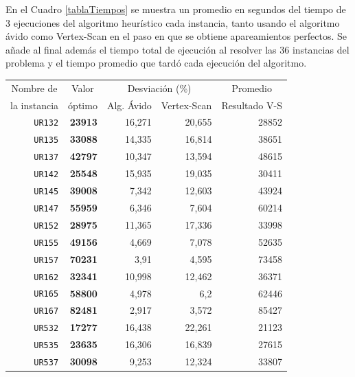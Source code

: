 \documentclass[11pt]{article}
\begin{document}
En el Cuadro \ref{tablaTiempos} se muestra un promedio en
segundos del tiempo de 3 ejecuciones del algoritmo heurístico
cada instancia, tanto usando el algoritmo ávido como Vertex-Scan 
en el paso en que se obtiene apareamientos perfectos. Se añade al
final además el tiempo total de ejecución al resolver las 36 instancias
del problema y el tiempo promedio que tardó cada ejecución del
algoritmo.

\begin{table}[htbp]
   \begin{center}
   \begin{tabular}{|r|r|r|r|r|}
   \hline
   \multicolumn{1}{|c|}{Nombre de} & \multicolumn{1}{c|}{Valor} & \multicolumn{ 2}{c|}{Desviación (\%)} & \multicolumn{1}{c|}{Promedio } \\ \cline{3-4}
   \multicolumn{1}{|c|}{la instancia} & \multicolumn{1}{c|}{óptimo} & \multicolumn{1}{c|}{Alg. Ávido} & \multicolumn{1}{c|}{Vertex-Scan} & \multicolumn{1}{c|}{Resultado V-S} \\ \hline
   \texttt{UR132} & \textbf{23913} & 16,271 & 20,655 & 28852 \\
   \texttt{UR135} & \textbf{33088} & 14,335 & 16,814 & 38651 \\
   \texttt{UR137} & \textbf{42797} & 10,347 & 13,594 & 48615 \\
   \texttt{UR142} & \textbf{25548} & 15,935 & 19,035 & 30411 \\
   \texttt{UR145} & \textbf{39008} & 7,342 & 12,603 & 43924 \\
   \texttt{UR147} & \textbf{55959} & 6,346 & 7,604 & 60214 \\
   \texttt{UR152} & \textbf{28975} & 11,365 & 17,336 & 33998 \\
   \texttt{UR155} & \textbf{49156} & 4,669 & 7,078 & 52635 \\
   \texttt{UR157} & \textbf{70231} & 3,91 & 4,595 & 73458 \\
   \texttt{UR162} & \textbf{32341} & 10,998 & 12,462 & 36371 \\
   \texttt{UR165} & \textbf{58800} & 4,978 & 6,2 & 62446 \\
   \texttt{UR167} & \textbf{82481} & 2,917 & 3,572 & 85427 \\
   \texttt{UR532} & \textbf{17277} & 16,438 & 22,261 & 21123 \\
   \texttt{UR535} & \textbf{23635} & 16,306 & 16,839 & 27615 \\
   \texttt{UR537} & \textbf{30098} & 9,253 & 12,324 & 33807 \\

\end{tabular}
\end{center}
\end{table}
\end{document}
